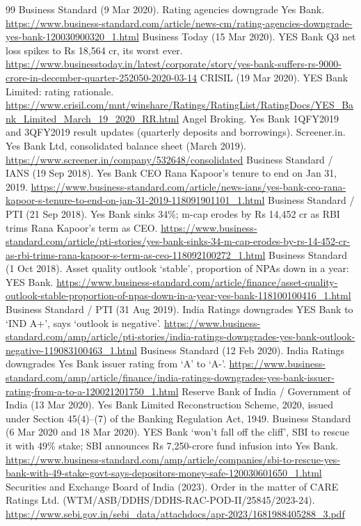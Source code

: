\begin{thebibliography}{99}
 Business Standard (9 Mar 2020). Rating agencies downgrade Yes Bank. \url{https://www.business-standard.com/article/news-cm/rating-agencies-downgrade-yes-bank-120030900320_1.html}
 Business Today (15 Mar 2020). YES Bank Q3 net loss spikes to Rs 18,564 cr, its worst ever. \url{https://www.businesstoday.in/latest/corporate/story/yes-bank-suffers-rs-9000-crore-in-december-quarter-252050-2020-03-14}
 CRISIL (19 Mar 2020). YES Bank Limited: rating rationale. \url{https://www.crisil.com/mnt/winshare/Ratings/RatingList/RatingDocs/YES_Bank_Limited_March_19_2020_RR.html}
 Angel Broking. Yes Bank 1QFY2019 and 3QFY2019 result updates (quarterly deposits and borrowings).
 Screener.in. Yes Bank Ltd, consolidated balance sheet (March 2019). \url{https://www.screener.in/company/532648/consolidated}
 Business Standard / IANS (19 Sep 2018). Yes Bank CEO Rana Kapoor's tenure to end on Jan 31, 2019. \url{https://www.business-standard.com/article/news-ians/yes-bank-ceo-rana-kapoor-s-tenure-to-end-on-jan-31-2019-118091901101_1.html}
 Business Standard / PTI (21 Sep 2018). Yes Bank sinks 34\%; m-cap erodes by Rs 14,452 cr as RBI trims Rana Kapoor's term as CEO. \url{https://www.business-standard.com/article/pti-stories/yes-bank-sinks-34-m-cap-erodes-by-rs-14-452-cr-as-rbi-trims-rana-kapoor-s-term-as-ceo-118092100272_1.html}
 Business Standard (1 Oct 2018). Asset quality outlook `stable', proportion of NPAs down in a year: YES Bank. \url{https://www.business-standard.com/article/finance/asset-quality-outlook-stable-proportion-of-npas-down-in-a-year-yes-bank-118100100416_1.html}
 Business Standard / PTI (31 Aug 2019). India Ratings downgrades YES Bank to `IND A+', says `outlook is negative'. \url{https://www.business-standard.com/amp/article/pti-stories/india-ratings-downgrades-yes-bank-outlook-negative-119083100463_1.html}
 Business Standard (12 Feb 2020). India Ratings downgrades Yes Bank issuer rating from `A' to `A-'. \url{https://www.business-standard.com/amp/article/finance/india-ratings-downgrades-yes-bank-issuer-rating-from-a-to-a-120021201750_1.html}
 Reserve Bank of India / Government of India (13 Mar 2020). Yes Bank Limited Reconstruction Scheme, 2020, issued under Section 45(4)--(7) of the Banking Regulation Act, 1949.
 Business Standard (6 Mar 2020 and 18 Mar 2020). YES Bank `won't fall off the cliff', SBI to rescue it with 49\% stake; SBI announces Rs 7,250-crore fund infusion into Yes Bank. \url{https://www.business-standard.com/amp/article/companies/sbi-to-rescue-yes-bank-with-49-stake-govt-says-depositors-money-safe-120030601650_1.html}
 Securities and Exchange Board of India (2023). Order in the matter of CARE Ratings Ltd. (WTM/ASB/DDHS/DDHS-RAC-POD-II/25845/2023-24). \url{https://www.sebi.gov.in/sebi_data/attachdocs/apr-2023/1681988405288_3.pdf}
\end{thebibliography}
